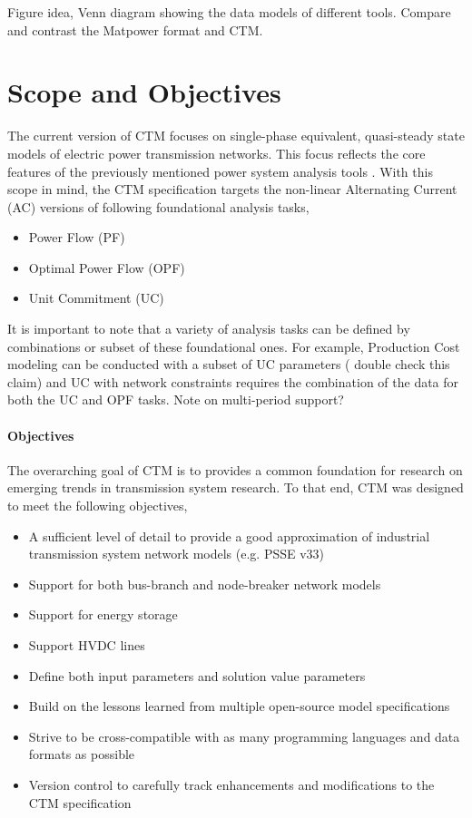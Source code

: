 \documentclass{article}
\newcommand{\matpower}[0]{{\sc Matpower}}
\begin{document}
{\color{red} Figure idea, Venn diagram showing the data models of different tools.  Compare and contrast the \matpower{} format and CTM.}


\section{Scope and Objectives}

The current version of CTM focuses on single-phase equivalent, quasi-steady state models of electric power transmission networks.  This focus reflects the core features of the previously mentioned power system analysis tools \cite{}.  With this scope in mind, the CTM specification targets the non-linear Alternating Current (AC) versions of following foundational analysis tasks,
%
\begin{itemize}
    \item Power Flow (PF)
    \item Optimal Power Flow (OPF)
    \item Unit Commitment (UC)
\end{itemize}
%
It is important to note that a variety of analysis tasks can be defined by combinations or subset of these foundational ones.  For example, Production Cost modeling can be conducted with a subset of UC parameters ({\color{red} double check this claim}) and UC with network constraints requires the combination of the data for both the UC and OPF tasks.
%
{\color{red} Note on multi-period support?}


\paragraph{Objectives}
%
The overarching goal of CTM is to provides a common foundation for research on emerging trends in transmission system research.  To that end, CTM was designed to meet the following objectives,
\begin{itemize}
    \item A sufficient level of detail to provide a good approximation of industrial transmission system network models (e.g. PSSE v33)
    \item Support for both bus-branch and node-breaker network models
    \item Support for energy storage
    \item Support HVDC lines
    \item Define both input parameters and solution value parameters
    \item Build on the lessons learned from multiple open-source model specifications
    \item Strive to be cross-compatible with as many programming languages and data formats as possible
    \item Version control to carefully track enhancements and modifications to the CTM specification
\end{itemize}
\end{document}
